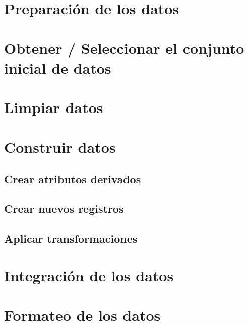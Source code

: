 \documentclass[11pt,a4paper,twoside]{tesis}
\begin{document}
\section{Preparación de los datos}
\section{Obtener / Seleccionar el conjunto inicial de datos}
\section{Limpiar datos}
\section{Construir datos}
\subsection{Crear atributos derivados}
\subsection{Crear nuevos registros}
\subsection{Aplicar transformaciones}
\section{Integración de los datos}
\section{Formateo de los datos}
\end{document}

